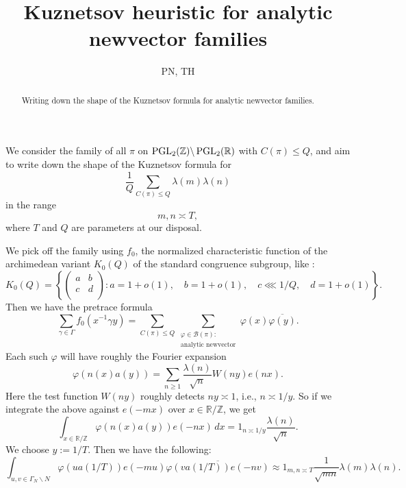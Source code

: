 \documentclass[reqno]{amsart} 
\title{Kuznetsov heuristic for analytic newvector families}
\author{PN, TH}
\begin{document}
\begin{abstract}
  Writing down the shape of the Kuznetsov formula for analytic newvector families.
\end{abstract}

We consider the family of all $\pi$ on $\operatorname{PGL}_2(\mathbb{Z}) \backslash \operatorname{PGL}_2(\mathbb{R})$ with $C(\pi) \leq Q$, and aim to write down the shape of the Kuznetsov formula for
\begin{equation*}
  \frac{1}{Q}\sum _{C(\pi) \leq Q} \lambda(m) \lambda(n)
\end{equation*}
in the range
\begin{equation*}
m, n \asymp T,
\end{equation*}
where $T$ and $Q$ are parameters at our disposal.

We pick off the family using $f_0$, the normalized characteristic function of the archimedean variant $K_0(Q)$ of the standard congruence subgroup, like \cite{JN19a}:
\begin{equation*}
  K_0(Q)
  = \left\{
    \begin{pmatrix}
a & b \\
c & d \\
    \end{pmatrix}
    :
    a = 1 + o(1), \quad
    b = 1 + o(1),
    \quad
    c \lll 1/Q,
    \quad
    d = 1 + o(1)
  \right\}.
\end{equation*}
Then we have the pretrace formula
\begin{equation*}
  \sum _{\gamma \in \Gamma } f_0 (x  ^{-1} \gamma y)
  =
  \sum _{C(\pi) \leq Q } \sum _{
    \substack{
      \varphi \in \mathcal{B}(\pi) :  \\
      \text{analytic newvector}
    }
  } \varphi(x) \overline{\varphi(y)}.
\end{equation*}
Each such $\varphi$ will have roughly the Fourier expansion
\begin{equation*}
  \varphi( n(x) a(y)) = \sum _{n \geq 1} \frac{\lambda(n)}{ \sqrt{n} } W(n y) e(n x).
\end{equation*}
Here the test function $W(n y)$ roughly detects $n y \asymp 1$, i.e., $n \asymp 1/y$.  So if we integrate the above against $e(-m x)$ over $x \in \mathbb{R} / \mathbb{Z}$, we get
\begin{equation*}
  \int _{x \in \mathbb{R} / \mathbb{Z} } \varphi(n(x) a(y)) e(-n x) \, d x
  =
  1 _{n \asymp 1/y} \frac{\lambda(n)}{ \sqrt{n}}.
\end{equation*}
We choose $y := 1/T$.  Then we have the following:
\begin{equation*}
  \int _{u, v \in \Gamma_N \backslash N} \varphi(u a(1/T)) e(-m u) \overline{\varphi(v a(1/T)) e(-n v)}
  \approx
  1 _{m, n \asymp T} \frac{1}{ \sqrt{m n}} \lambda(m) \lambda(n).  
\end{equation*}
\end{document}
